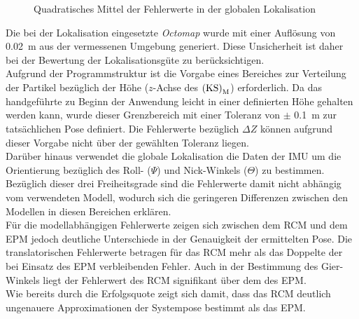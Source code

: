 
\prever{
}

\begin{figure}

\caption{Quadratisches Mittel der Fehlerwerte in der globalen Lokalisation}
\label{fig.glob_loc}
\end{figure}

Die bei der Lokalisation eingesetzte \textit{Octomap} wurde mit einer Auflösung von \SI{0,02}{\meter} aus der vermessenen Umgebung generiert. Diese Unsicherheit ist daher bei der Bewertung der Lokalisationsgüte zu berücksichtigen.\\
Aufgrund der Programmstruktur ist die Vorgabe eines Bereiches zur Verteilung der Partikel bezüglich der Höhe ($z$-Achse des ${\mathrm{(KS)}}_{\mathrm{M}}$) erforderlich. Da das handgeführte \kps{} zu Beginn der Anwendung leicht in einer definierten Höhe gehalten werden kann, wurde dieser Grenzbereich mit einer Toleranz von $\pm$ \SI{0,1}{\meter} zur tatsächlichen Pose definiert. Die Fehlerwerte bezüglich $\Delta Z$ können aufgrund dieser Vorgabe nicht über der gewählten Toleranz liegen.\\
Darüber hinaus verwendet die globale Lokalisation die Daten der IMU um die Orientierung bezüglich des Roll- ($\Psi$) und Nick-Winkels ($\Theta$) zu bestimmen.\\
Bezüglich dieser drei Freiheitsgrade sind die Fehlerwerte damit nicht abhängig vom verwendeten Modell, wodurch sich die geringeren Differenzen zwischen den Modellen in diesen Bereichen erklären.\\

Für die modellabhängigen Fehlerwerte zeigen sich zwischen dem RCM und dem EPM jedoch deutliche Unterschiede in der Genauigkeit der ermittelten Pose. Die translatorischen Fehlerwerte betragen für das RCM mehr als das Doppelte der bei Einsatz des EPM verbleibenden Fehler. Auch in der Bestimmung des Gier-Winkels liegt der Fehlerwert des RCM signifikant über dem des EPM.\\
Wie bereits durch die Erfolgsquote zeigt sich damit, dass das RCM deutlich ungenauere Approximationen der Systempose bestimmt als das EPM.\\


